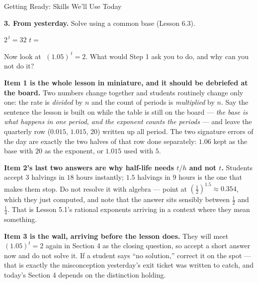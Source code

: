 \documentclass[10pt]{article}
\begin{document}
\begin{notesbox}{Getting Ready: Skills We'll Use Today}
\vspace{0.22in}

\textbf{3. From yesterday.} Solve using a common base (Lesson 6.3).

\vspace{4pt}
\hspace*{1.2em} $2^{\,t} = 32$ \hfill $t=$ 

\vspace{6pt}
\hspace*{1.2em} Now look at $\;(1.05)^{\,t} = 2$. \; What would Step 1 ask you to do, and why can you
not do it? 

\end{notesbox}

\begin{teachernote}
\textbf{Item 1 is the whole lesson in miniature, and it should be debriefed at the board.} Two numbers
change together and students routinely change only one: the rate is \emph{divided} by $n$ and the count
of periods is \emph{multiplied} by $n$. Say the sentence the lesson is built on while the table is
still on the board --- \emph{the base is what happens in one period, and the exponent counts the
periods} --- and leave the quarterly row ($0.015$, $1.015$, $20$) written up all period. The two
signature errors of the day are exactly the two halves of that row done separately: $1.06$ kept as the
base with $20$ as the exponent, or $1.015$ used with $5$.

\textbf{Item 2's last two answers are why half-life needs $t/h$ and not $t$.} Students accept $3$
halvings in $18$ hours instantly; $1.5$ halvings in $9$ hours is the one that makes them stop. Do not
resolve it with algebra --- point at $\left(\frac12\right)^{1.5}\approx0.354$, which they just
computed, and note that the answer sits sensibly between $\frac12$ and $\frac14$. That is Lesson 5.1's
rational exponents arriving in a context where they mean something.

\textbf{Item 3 is the wall, arriving before the lesson does.} They will meet
$(1.05)^{t}=2$ again in Section 4 as the closing question, so accept a short answer now and do not
solve it. If a student says ``no solution,'' correct it on the spot --- that is exactly the
misconception yesterday's exit ticket was written to catch, and today's Section 4 depends on the
distinction holding.
\end{teachernote}
\end{document}
